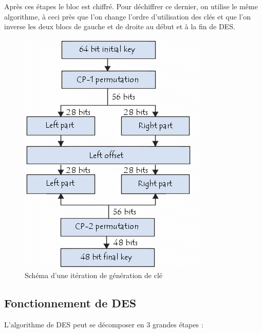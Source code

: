 \documentclass[a4paper,12pt]{article}
\begin{document}
Après ces étapes le bloc est chiffré. Pour déchiffrer ce dernier, on utilise le même algorithme, à ceci près que l'on change l'ordre d'utilisation des clés et que l'on inverse les deux blocs de gauche et de droite au début et à la fin de DES.

\begin{figure}[h]
\centering
\includegraphics[scale=0.80]{./images/keygen.png}
\caption{Schéma d'une itération de génération de clé}
\label{fig:keygen}
\end{figure}

\clearpage

\subsection{Fonctionnement de DES}	

L'algorithme de DES peut se décomposer en 3 grandes étapes :
\end{document}
